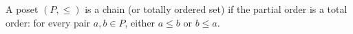A poset $(P, \leq)$ is a chain (or totally ordered set) if the partial order is a total order: for every pair $a, b \in P$, either $a \leq b$ or $b \leq a$.
